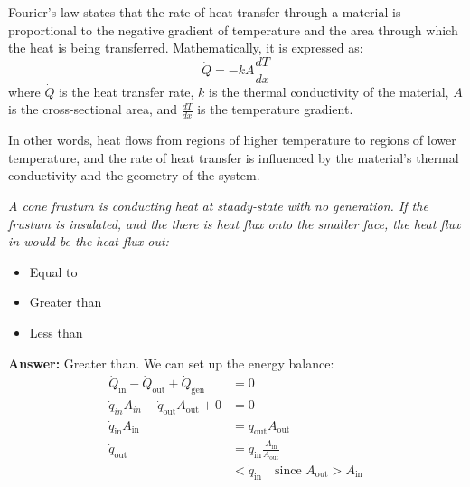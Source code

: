 \documentclass[11pt]{report}
\begin{document}
\begin{definition}
    Fourier's law states that the rate of heat transfer through a material is proportional to the negative gradient of temperature and the area through which the heat is being transferred. Mathematically, it is expressed as:
    \begin{equation}
        \dot{Q} = -k A \frac{dT}{dx}
    \end{equation}
    where $\dot{Q}$ is the heat transfer rate, $k$ is the thermal conductivity of the material, $A$ is the cross-sectional area, and $\frac{dT}{dx}$ is the temperature gradient.

    In other words, heat flows from regions of higher temperature to regions of lower temperature, and the rate of heat transfer is influenced by the material's thermal conductivity and the geometry of the system.
\end{definition}
\begin{example}
   \textit{ A cone frustum is conducting heat at staady-state with no generation. If the frustum is insulated, and the there is heat flux onto the smaller face, the heat flux in would be \underline{\hspace{2cm}} the heat flux out:}
    \begin{itemize}
        \item Equal to
        \item Greater than
        \item Less than
    \end{itemize}

    \textbf{Answer:} Greater than. We can set up the energy balance:
    \begin{align*}
        \dot{Q}_\text{in} - \dot{Q}_\text{out} + \dot{Q}_\text{gen} &= 0 \\
        \dot{q}_{in} A_{in} - \dot{q}_\text{out} A_\text{out} + 0 &= 0 \\
        \dot{q}_\text{in} A_\text{in} &= \dot{q}_\text{out} A_\text{out} \\
        \dot{q}_\text{out} &= \dot{q}_\text{in} \frac{A_\text{in}}{A_\text{out}} \\
        &< \dot{q}_\text{in} \quad \text{since } A_\text{out} > A_\text{in}
    \end{align*}
\end{example}
\end{document}
